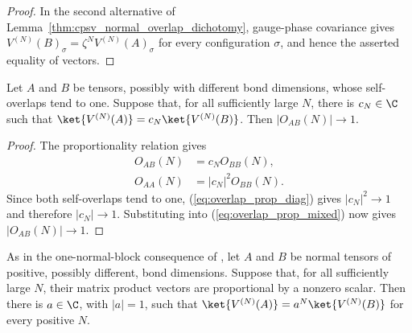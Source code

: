 \begin{proof}\leanok
    In the second alternative of
    Lemma~\ref{thm:cpsv_normal_overlap_dichotomy}, gauge-phase covariance
    gives $V^{(N)}(B)_\sigma=\zeta^N V^{(N)}(A)_\sigma$ for every configuration
    $\sigma$, and hence the asserted equality of vectors.
\end{proof}

\begin{lemma}
    \label{thm:eventual_proportional_normalized_overlap_norm_one}
    \leanok
    Let $A$ and $B$ be tensors, possibly with different bond dimensions, whose
    self-overlaps tend to one. Suppose that, for all sufficiently large $N$,
    there is $c_N\in\C$ such that
    $\ket{V^{(N)}(A)}=c_N\ket{V^{(N)}(B)}$. Then $|O_{AB}(N)|\to1$.
\end{lemma}

\begin{proof}\leanok
    The proportionality relation gives
    \begin{align}
        O_{AB}(N) & =c_NO_{BB}(N),
        \label{eq:overlap_prop_mixed}  \\
        O_{AA}(N) & =|c_N|^2O_{BB}(N).
        \label{eq:overlap_prop_diag}
    \end{align}
    Since both self-overlaps tend to one, (\ref{eq:overlap_prop_diag}) gives $|c_N|^2\to1$ and therefore $|c_N|\to1$. Substituting into
    (\ref{eq:overlap_prop_mixed}) now gives $|O_{AB}(N)|\to1$.
\end{proof}

\begin{lemma}
    \label{thm:normal_proportional_mpv_geometric_phase}
    \leanok
    As in the one-normal-block consequence of
    \cite[Corollary~A.3 and the proof of Theorem~2.10]{Cirac2016MPDO_arXiv},
    let $A$ and $B$ be normal tensors of positive, possibly different, bond
    dimensions. Suppose that, for all sufficiently large $N$, their matrix
    product vectors are proportional by a nonzero scalar. Then there is
    $a\in\C$, with $|a|=1$, such that
    $\ket{V^{(N)}(A)}=a^N\ket{V^{(N)}(B)}$ for every positive $N$.
\end{lemma}

